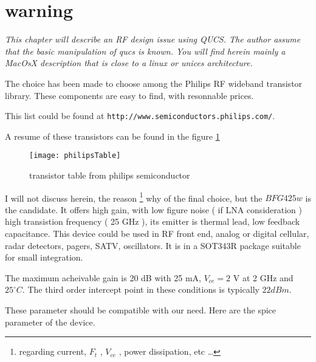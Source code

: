 %
%
%
%

\section*{warning}

\textit{
This chapter will describe an RF design issue using QUCS. The author assume that the basic manipulation of qucs is known. You will find herein mainly a MacOsX description that is close to a linux or unices architecture.
}



The choice has been made to choose among the Philips RF wideband transistor library. These components are easy to find, with resonnable prices.

This list could be found at \texttt{http://www.semiconductors.philips.com/}.

A resume of these transistors can be found in the figure \ref{design:pa:toTable}
\begin{figure}[htbp]
\begin{center}
\texttt{[image: philipsTable]}
\caption{transistor table from philips semiconductor}
\label{design:pa:toTable}
\end{center}
\end{figure}

I will not discuss herein, the reason \footnote{regarding current, $F_t$ , $V_{ce}$ , power dissipation, etc \ldots} why of the final choice, but the $BFG425w$ is the candidate. It offers high gain, with low figure noise ( if LNA consideration )  high transistion frequency ( 25 GHz ), its emitter is thermal lead, low feedback capacitance. This device could be used in RF front end, analog or digital cellular, radar detectors, pagers, SATV, oscillators. It is in a SOT343R package suitable for small integration.

The maximum acheivable gain is 20 dB with 25 mA, $V_{ce} = 2$ V at 2 GHz and $25^\circ C$. The third order intercept point in these conditions is typically $22 dBm$.

These parameter should be compatible with our need. Here are the spice parameter of the device.

